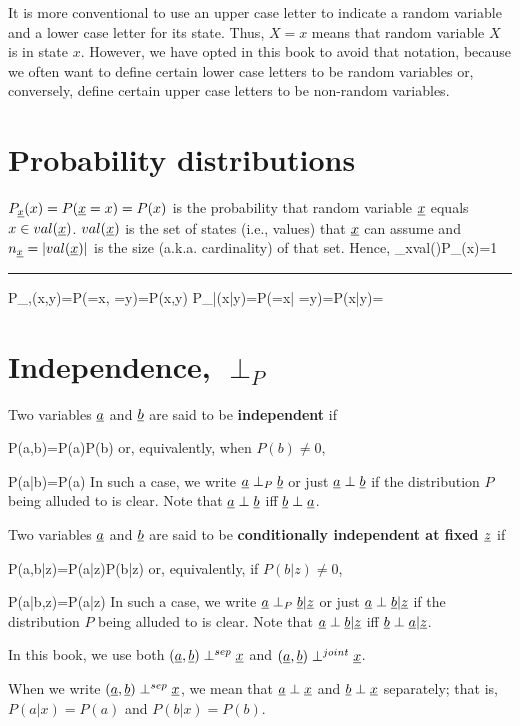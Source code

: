 It is more
conventional to
use an upper
case letter to
indicate
a random
variable
and a lower case letter
for its state.
Thus, $X=x$ means that
random variable
$X$ is in state $x$.
However,
we have
opted
in this
book to
avoid
that notation,
because
we often
want to define
certain lower
case letters
to be random variables
or, conversely, define certain upper
case letters to
be non-random variables.

\section{Probability distributions}
 $P_\rvx(x)=P(\rvx=x)=P(x)$ is the probability that random variable $\rvx$ equals $x\in val(\rvx)$. $val(\rvx)$ is the set of states (i.e., values) that $\rvx$ can assume and $n_\rvx = |val(\rvx)|$ is the size (a.k.a. cardinality) of that set. Hence,
\beq
\sum_{x\in val(\rvx)}P_\rvx(x)=1
\eeq

\hrule
\beq
P_{\rvx,\rvy}(x,y)=P(\rvx=x, \rvy=y)=P(x,y)
\eeq
\beq
P_{\rvx|\rvy}(x|y)=P(\rvx=x| \rvy=y)=P(x|y)=
\eeq

\section{Independence, $\perp_P$}
\label{sec-perp-p}

Two variables $\rva$ and $\rvb$
are said to be {\bf independent} if

\beq
P(a,b)=P(a)P(b)
\eeq
or,
equivalently, when $P(b)\neq 0$,

\beq
P(a|b)=P(a)
\eeq
In such a case, we write $\rva\perp_P \rvb$
or just $\rva\perp \rvb$ if
the distribution $P$
being alluded to is clear.
Note that
$\rva\perp \rvb$ iff
$\rvb\perp \rva$.


Two variables $\rva$ and $\rvb$ are
said to be {\bf conditionally independent at fixed $\rvz$} if

\beq
P(a,b|z)=P(a|z)P(b|z)\eeq
or, equivalently, if $P(b|z)\neq 0$,

\beq
P(a|b,z)=P(a|z)
\eeq
In such a case, we write $\rva\perp_P \rvb|\rvz$
or just $\rva\perp \rvb|\rvz$ if
the distribution $P$
being alluded to is clear.
Note that
$\rva\perp \rvb|\rvz$ iff
$\rvb\perp \rva|\rvz$.


In
this book, we use both
$(\rva, \rvb)\perp^{sep} \rvx$
and $(\rva, \rvb)\perp^{joint} \rvx$.

When we write $(\rva, \rvb)\perp^{sep} \rvx$,
we mean that
$\rva\perp \rvx$
and $\rvb\perp\rvx$ separately; that is,
$P(a|x)=P(a)$
and $P(b|x)=P(b)$.

